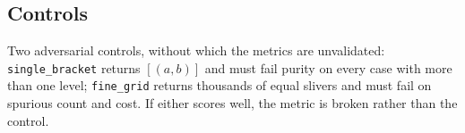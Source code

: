 \documentclass[11pt,a4paper]{article}
\begin{document}
\subsection{Controls}

Two adversarial controls, without which the metrics are unvalidated:
\texttt{single\_bracket} returns $[(a,b)]$ and must fail purity on every case with more than one
level; \texttt{fine\_grid} returns thousands of equal slivers and must fail on spurious count
and cost. If either scores well, the metric is broken rather than the control.




\end{document}
